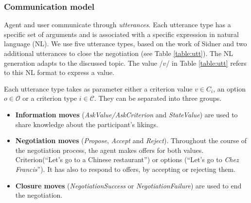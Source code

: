 \documentclass[runningheads,a4paper]{llncs}
\begin{document}
	\subsubsection{Communication model}
	\label{Comm}
	Agent and user communicate through \emph{utterances}. Each utterance type has a specific set of arguments and is associated with a specific expression in natural language (NL). We use five utterance types, based on the work of Sidner \cite{sidner1994artificial} and two additional utterances to close the negotiation (see Table \ref{table:utt}). The NL generation adapts to the discussed topic. The value /$v$/ in Table \ref{table:utt} refers to this NL format to express a value.
	
	
	Each utterance type takes as parameter either a criterion value $v \in C_i$, an option $o \in \mathcal{O}$ or a criterion type $i \in \mathcal{C}$. They can be separated into three groups. 
	
	\begin{itemize}
		\item \textbf{Information moves }(\textit{AskValue/AskCriterion} and \textit{StateValue}) are used to share knowledge about the participant's likings.
		\item \textbf{Negotiation moves} (\textit{Propose}, \textit{Accept} and \textit{Reject}). Throughout the course of the negotiation process, the agent makes offers for both values. Criterion(``Let's go to a Chinese restaurant'') or options (``Let's go to \emph{Chez Francis}''). It has also to respond to offers, by accepting or rejecting them.
		
		\item \textbf{Closure moves} (\textit{NegotiationSuccess} or \textit{NegotiationFailure}) are used to end the negotiation.
	\end{itemize}
	
	
	
\end{document}

